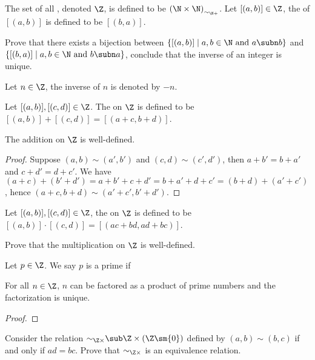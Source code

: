 \documentclass[10pt]{article}
\begin{document}
\begin{definition}
    The set of all , denoted $\Z$, is defined to be ${(\N\times{\N})}_{{\sim}_{\N+}}$. Let $[(a,b)]\in\Z$, the  of $[(a,b)]$ is defined to be $[(b,a)]$.
\end{definition}
\begin{problem}
    Prove that there exists a bijection between $\{[(a,b)]\mid a,b\in\N\ \text{and}\ a\subn b\}$ and $\{[(b,a)]\mid a,b\in\N\ \text{and}\ b\subn a\}$, conclude that the inverse of an integer is unique.
\end{problem}
\par
Let $n\in\Z$, the inverse of $n$ is denoted by $-n$.
\begin{definition}
    Let $[(a,b)],[(c,d)]\in\Z$. The  on $\Z$ is defined to be $[(a,b)]+[(c,d)]=[(a+c,b+d)]$.
\end{definition}
\begin{proposition}
    The addition on $\Z$ is well-defined.
\end{proposition}
\begin{proof}
    Suppose $(a,b)\sim(a',b')$ and $(c,d)\sim(c',d')$, then $a+b'=b+a'$ and $c+d'=d+c'$. We have $(a+c)+(b'+d')=a+b'+c+d'=b+a'+d+c'=(b+d)+(a'+c')$, hence $(a+c,b+d)\sim(a'+c',b'+d')$.
\end{proof}
\begin{definition}
    Let $[(a,b)],[(c,d)]\in\Z$, the  on $\Z$ is defined to be $[(a,b)]\cdot[(c,d)]=[(ac+bd,ad+bc)]$.
\end{definition}
\begin{problem}
    Prove that the multiplication on $\Z$ is well-defined.
\end{problem}
\begin{definition}
    Let $p\in\Z$. We say $p$ is a prime if 
\end{definition}
\begin{theorem}
    For all $n\in\Z$, $n$ can be factored as a product of prime numbers and the factorization is unique.
\end{theorem}
\begin{proof}
    
\end{proof}
\begin{problem}
    Consider the relation ${\sim}_{\Z\times}\sub\Z\times(\Z\sm\{0\})$ defined by $(a,b)\sim(b,c)$ if and only if $ad=bc$. Prove that ${\sim}_{\Z\times}$ is an equivalence relation.
\end{problem}
\end{document}
